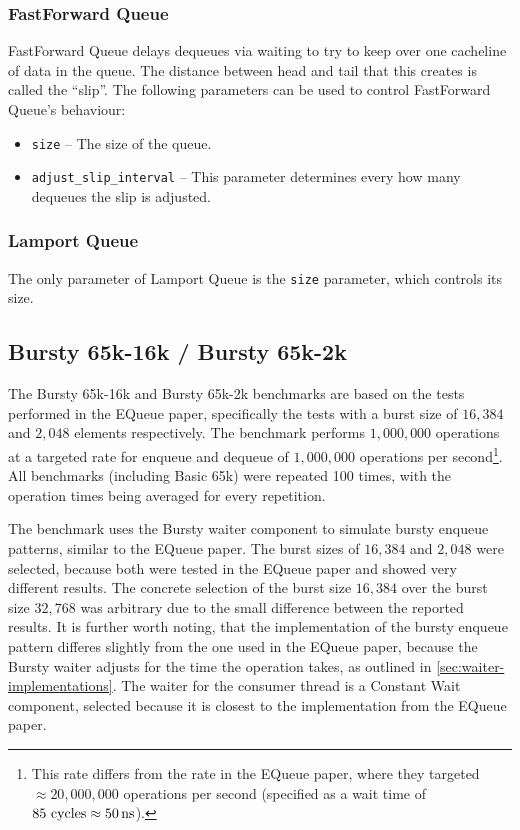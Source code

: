 \subsubsection*{FastForward Queue}
FastForward Queue delays dequeues via waiting to try to keep over one cacheline of data in the queue\cite{FastForward}.
The distance between head and tail that this creates is called the ``slip''.
The following parameters can be used to control FastForward Queue's behaviour:
\begin{itemize}
    \item \texttt{size} -- The size of the queue.
    \item \texttt{adjust\_slip\_interval} -- This parameter determines every how many dequeues the slip is adjusted.
\end{itemize}

\subsubsection*{Lamport Queue}
The only parameter of Lamport Queue is the \texttt{size} parameter, which controls its size\cite{Lamport}.

\subsection{Bursty 65k-16k / Bursty 65k-2k}
\label{sec:bench-bursty-65k-16k}

The Bursty 65k-16k and Bursty 65k-2k benchmarks are based on the tests performed in the EQueue paper,
specifically the tests with a burst size of $16,384$ and $2,048$ elements respectively.
The benchmark performs $1,000,000$ operations at a targeted rate for enqueue and dequeue of $1,000,000$
operations per second\footnote{This rate differs from the rate in the EQueue paper, where they targeted
    $\approx 20,000,000$ operations per second (specified as a wait time of $85\text{ cycles}\approx \SI{50}{\nano\second}$).
}.
All benchmarks (including Basic 65k) were repeated 100 times, with the operation times being averaged for
every repetition.

The benchmark uses the Bursty waiter component to simulate bursty enqueue patterns, similar to the EQueue paper.
The burst sizes of $16,384$ and $2,048$ were selected, because both were tested in the EQueue paper and showed
very different results.
The concrete selection of the burst size $16,384$ over the burst size $32,768$ was arbitrary due to the small
difference between the reported results.
It is further worth noting, that the implementation of the bursty enqueue pattern differes slightly from the
one used in the EQueue paper, because the Bursty waiter adjusts for the time the operation takes, as outlined
in \autoref{sec:waiter-implementations}.
The waiter for the consumer thread is a Constant Wait component, selected because it is closest to the
implementation from the EQueue paper.

